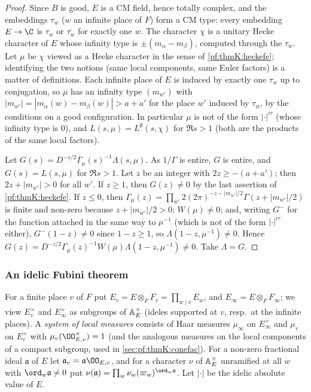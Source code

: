 \begin{proof}
Since $B$ is good, $E$ is a CM field, hence totally complex, and the embeddings $\tau_w$ ($w$ an infinite place of $F$) form
a CM type: every embedding $E\to\C$ is $\tau_w$ or $\overline{\tau_w}$ for exactly one $w$. The character $\chi$ is a unitary
Hecke character of $E$ whose infinity type is $\pm(m_\alpha-m_\beta)$, computed through the $\tau_w$. Let $\mu$ be $\chi$
viewed as a Hecke character in the sense of \cref{pf:thmK:heckefe}; identifying the two notions (same local components,
same Euler factors) is a matter of definitions. Each infinite place of $E$ is induced by exactly one $\tau_w$ up to
conjugation, so $\mu$ has an infinity type $(m_{w'})$ with $|m_{w'}|=|m_\alpha(w)-m_\beta(w)|>a+a'$ for the place $w'$
induced by $\tau_w$, by the conditions on a good configuration. In particular $\mu$ is not of the form $|\cdot|^{i\tau}$
(whose infinity type is $0$), and $L(s,\mu)=L^\emptyset(s,\chi)$ for $\Re s>1$ (both are the products of the same local
factors).

Let $G(s)=D^{-s/2}\Gamma_\mu(s)^{-1}\Lambda(s,\mu)$. As $1/\Gamma$ is entire, $G$ is entire, and $G(s)=L(s,\mu)$ for
$\Re s>1$. Let $z$ be an integer with $2z\ge-(a+a')$; then $2z+|m_{w'}|>0$ for all $w'$. If $z\ge1$, then $G(z)\ne0$ by the
last assertion of \cref{pf:thmK:heckefe}. If $z\le0$, then $\Gamma_\mu(z)=\prod_{w'}2(2\pi)^{-z-|m_{w'}|/2}
\Gamma(z+|m_{w'}|/2)$ is finite and non-zero because $z+|m_{w'}|/2>0$; $W(\mu)\ne0$; and, writing $G^-$ for the function
attached in the same way to $\mu^{-1}$ (which is not of the form $|\cdot|^{i\tau}$ either), $G^-(1-z)\ne0$ since
$1-z\ge1$, so $\Lambda(1-z,\mu^{-1})\ne0$. Hence $G(z)=D^{-z/2}\Gamma_\mu(z)^{-1}W(\mu)\Lambda(1-z,\mu^{-1})\ne0$. Take
$\Lambda=G$.
\end{proof}

\subsubsection{An idelic Fubini theorem}\label{sec:pf:thmK:idelefub}
For a finite place $v$ of $F$ put $E_v=E\otimes_FF_v=\prod_{w\mid v}E_w$, and $E_\infty=E\otimes_F F_\infty$; we view
$E_v^\times$ and $E_\infty^\times$ as subgroups of $\mathbb{A}_E^\times$ (ideles supported at $v$, resp.\ at the infinite
places). A \emph{system of local measures} consists of Haar measures $\mu_\infty$ on $E_\infty^\times$ and $\mu_v$ on
$E_v^\times$ with $\mu_v(\OO_{E,v}^\times)=1$ (and the analogous measures on the local components of a compact subgroup,
used in \cref{sec:pf:thmK:conefac}). For a non-zero fractional ideal $\mathfrak a$ of $E$ let $\mathfrak a_v=\mathfrak
a\OO_{E,v}$, and for a character $\nu$ of $\mathbb{A}_E^\times$ unramified at all $w$ with $\ord_w\mathfrak a\ne0$ put
$\nu(\mathfrak a)=\prod_w\nu_w(\varpi_w)^{\ord_w\mathfrak a}$. Let $|\cdot|$ be the idelic absolute value of $E$.

